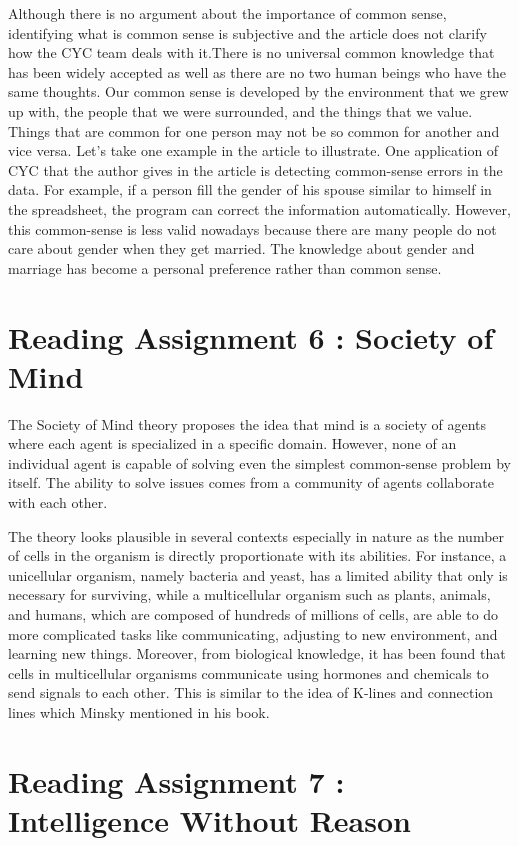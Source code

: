 \documentclass{article}
\begin{document}
Although there is no argument about the importance of common sense, identifying what is common sense is subjective and the article does not clarify how the CYC team deals with it.There is no universal common knowledge that has been widely accepted as well as there are no two human beings who have the same thoughts. Our common sense is developed by the environment that we grew up with, the people that we were surrounded, and the things that we value. Things that are common for one person may not be so common for another and vice versa. Let's take one example in the article to illustrate. One application of CYC that the author gives in the article is detecting common-sense errors in the data. For example, if a person fill the gender of his spouse similar to himself in the spreadsheet, the program can correct the information automatically. However, this common-sense is less valid nowadays because there are many people do not care about gender when they get married. The knowledge about gender and marriage has become a personal preference rather than common sense.

\section*{Reading Assignment 6 : Society of Mind}

The Society of Mind theory proposes the idea that mind is a society of agents where each agent is specialized in a specific domain. However, none of an individual agent is capable of solving even the simplest common-sense problem by itself. The ability to solve issues comes from a community of agents collaborate with each other.

The theory looks plausible in several contexts especially in nature as the number of cells in the organism is directly proportionate with its abilities. For instance, a unicellular organism, namely bacteria and yeast, has a limited ability that only is necessary for surviving, while a multicellular organism such as plants, animals, and humans, which are composed of hundreds of millions of cells, are able to do more complicated tasks like communicating, adjusting to new environment, and learning new things. Moreover, from biological knowledge, it has been found that cells in multicellular organisms communicate using hormones and chemicals to send signals to each other. This is similar to the idea of K-lines and connection lines which Minsky mentioned in his book.
\clearpage

\section*{Reading Assignment 7 : Intelligence Without Reason}
\end{document}
